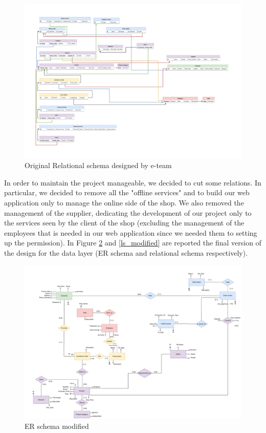 \begin{figure}[H]
\centering
\includegraphics[width=\textwidth]{Schemas/LogicRS_original.drawio.pdf}
\caption{Original Relational schema designed by e-team}
\label{ls_original}
\end{figure}
\restoregeometry
In order to maintain the project manageable, we decided to cut some relations. In particular, we decided to remove all the "offline services" and to build our web application only to manage the online side of the shop.
We also removed the management of the supplier, dedicating the development of our project only to the services seen by the client of the shop (excluding the management of the employees that is needed in our web application since we needed them to setting up the permission). In Figure \ref{er_modified} and \ref{ls_modified} are reported the final version of the design for the data layer (ER schema and relational schema respectively).

\begin{figure}[H]
\centering
\includegraphics[width=\textwidth]{Schemas/ER_modified.drawio.pdf}
\caption{ER schema modified}
\label{er_modified}
\end{figure}

